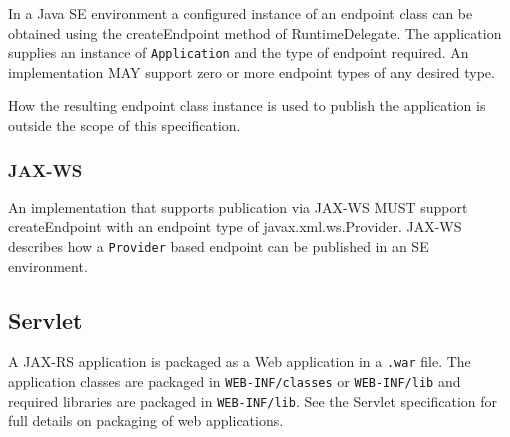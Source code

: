 In a Java SE environment a configured instance of an endpoint class can be obtained using the createEndpoint method of
RuntimeDelegate. The application supplies an instance of \lstinline{Application} and the type of endpoint required. An
implementation MAY support zero or more endpoint types of any desired type.

How the resulting endpoint class instance is used to publish the application is outside the scope of this specification.

\subsubsection{JAX-WS}

An implementation that supports publication via JAX-WS MUST support createEndpoint with an endpoint type of
javax.xml.ws.Provider. JAX-WS describes how a \lstinline{Provider} based endpoint can be published in an SE environment.

\subsection{Servlet}
\label{servlet}

A JAX-RS application is packaged as a Web application in a \textcolor{highlight green}{\lstinline{.war}} file. The
application classes are packaged in \textcolor{highlight green}{\lstinline{WEB-INF/classes}} or
\textcolor{highlight green}{\lstinline{WEB-INF/lib}} and required libraries are packaged in
\textcolor{highlight green}{\lstinline{WEB-INF/lib}}. See the Servlet specification for full details on packaging of web
applications.

